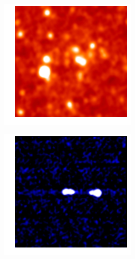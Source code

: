 \documentclass[a4paper]{article}
\begin{document}
        \begin{figure}[!h]
            \begin{subfigure}[b]{0.24\linewidth}
                \includegraphics[width=\linewidth]{example_ir}
                \caption{}
                \label{ir}
            \end{subfigure}
            \begin{subfigure}[b]{0.24\linewidth}
                \includegraphics[width=\linewidth]{example_radio}

\end{subfigure}
\end{figure}
\end{document}
